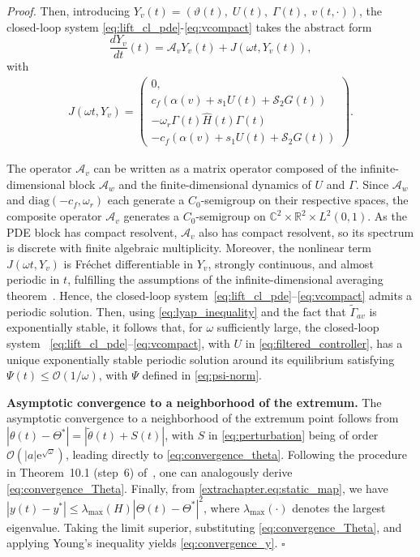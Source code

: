 \documentclass[letterpaper, 10 pt, conference]{ieeeconf}  %
\newenvironment{pf}
{\noindent\textit{Proof.}\hspace{1.2mm}}
{\hspace{\fill}$\square$}
\begin{document}
\begin{pf}
Then, introducing 
$Y_v(t)=(\vartheta(t),\;U(t),\;\Gamma(t), \;v(t,\cdot))$, the closed-loop system \eqref{eq:lift_cl_pde}-\eqref{eq:vcompact} takes the abstract form
\begin{equation}
\frac{dY_v}{dt}(t)=\mathcal{A}_v Y_v(t)+J(\omega t,Y_v(t)), \label{eq:abstractcompact}
\end{equation}
with
\begin{align*}
J(\omega t,Y_v)=\left(\begin{array}{c}
 0,\\
c_f\left(\alpha(v) + s_1 U(t) + \mathcal{S}_2G(t)\right)\\
-\omega_r\Gamma(t)\hat{H}(t)\Gamma(t)\\
-c_f\left(\alpha(v) + s_1 U(t) + \mathcal{S}_2G(t)\right)
\end{array}\right).
\end{align*}

The operator $\mathcal{A}_v$ can be written as a matrix operator composed of the infinite-dimensional block $\mathcal{A}_w$ and the finite-dimensional dynamics of $U$ and $\Gamma$. Since $\mathcal{A}_w$ and $\mathrm{diag}(-c_f,\omega_r)$ each generate a $C_0$-semigroup on their respective spaces, the composite operator $\mathcal{A}_v$ generates a $C_0$-semigroup on $\mathbb{C}^2\times\mathbb{R}^2\times L^2(0,1)$. As the PDE block has compact resolvent, $\mathcal{A}_v$ also has compact resolvent, so its spectrum is discrete with finite algebraic multiplicity. Moreover, the nonlinear term $J(\omega t,Y_v)$ is Fréchet differentiable in $Y_v$, strongly continuous, and almost periodic in $t$, fulfilling the assumptions of the infinite-dimensional averaging theorem~\cite{book2022}. Hence, the closed-loop system~\eqref{eq:lift_cl_pde}--\eqref{eq:vcompact} admits a periodic solution. Then, using \eqref{eq:lyap_inequality} and the fact that $\tilde{\Gamma}_{av}$ is exponentially stable, it follows that, for $\omega$ sufficiently large, the closed-loop system ~\eqref{eq:lift_cl_pde}--\eqref{eq:vcompact}, with $U$ in \eqref{eq:filtered_controller}, has a unique exponentially stable periodic solution around its equilibrium
satisfying $\Psi(t)\leq \mathcal{O}(1/\omega)$, with $\Psi$ defined in \eqref{eq:psi-norm}.

\textbf{Asymptotic convergence to a neighborhood of the
extremum.} The asymptotic convergence to a neighborhood of the extremum point follows from 
$|\theta(t) - \Theta^{*}| = |\tilde{\theta}(t) + S(t)|$, with $S$ in \eqref{eq:perturbation} being of order $\mathcal{O}(|a|\mathrm{e}^{\sqrt{\omega}})$, leading directly to 
\eqref{eq:convergence_theta}. Following the procedure in Theorem~10.1 (step~6) of~\cite{book2022}, one can analogously derive \eqref{eq:convergence_Theta}. Finally, from \eqref{extrachapter.eq:static_map}, we have $|y(t)-y^{*}|\leq \lambda_{\max}(H)|\Theta(t)-\Theta^{*}|^{2}$, where $\lambda_{\max}(\cdot)$ denotes the largest eigenvalue. Taking the limit superior, substituting \eqref{eq:convergence_Theta}, and applying Young’s inequality yields \eqref{eq:convergence_y}.
\end{pf}
\end{document}
